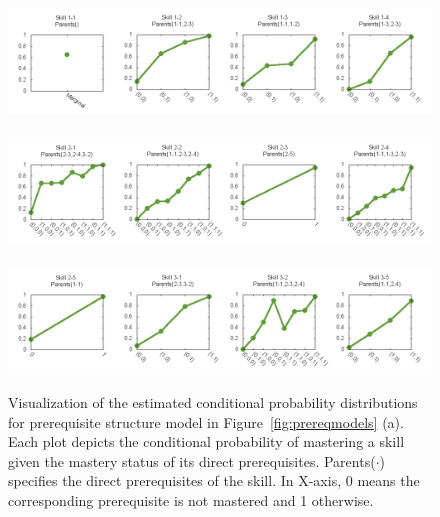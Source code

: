 \documentclass{edm_template}
\begin{document}
{	\begin{figure}[!ht]
		\begin{center}
			\includegraphics[width=1.0\linewidth]{figures/chap123_noorder_cpt_1_line.png}~\\
			\includegraphics[width=1.0\linewidth]{figures/chap123_noorder_cpt_2_line.png}~\\
			\includegraphics[width=1.0\linewidth]{figures/chap123_noorder_cpt_3_line.png}
		\end{center}
		\caption{Visualization of the estimated conditional probability distributions for prerequisite structure model in Figure~\ref{fig:prereqmodels} (a). 
			Each plot depicts the conditional probability of mastering a skill given the mastery status of its direct prerequisites.
			Parents($\cdot$) specifies the direct prerequisites of the skill. 
			In X-axis, 0 means the corresponding prerequisite is not mastered and 1 otherwise.} 
		\label{fig:chap123noorderCPT}
	\end{figure}
	
}
\end{document}
